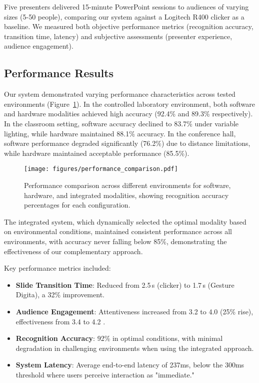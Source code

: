 \documentclass[arxiv,usenatbib]{iupartex}
\begin{document}
Five presenters delivered 15-minute PowerPoint sessions to audiences of varying sizes (5-50 people), comparing our system against a Logitech R400 clicker as a baseline. We measured both objective performance metrics (recognition accuracy, transition time, latency) and subjective assessments (presenter experience, audience engagement).

\subsection{Performance Results}
Our system demonstrated varying performance characteristics across tested environments (Figure~\ref{fig3}). In the controlled laboratory environment, both software and hardware modalities achieved high accuracy (92.4\% and 89.3\% respectively). In the classroom setting, software accuracy declined to 83.7\% under variable lighting, while hardware maintained 88.1\% accuracy. In the conference hall, software performance degraded significantly (76.2\%) due to distance limitations, while hardware maintained acceptable performance (85.5\%).

\begin{figure}
    \begin{center}
        \label{fig3}
        \texttt{[image: figures/performance\_comparison.pdf]}
        \caption{Performance comparison across different environments for software, hardware, and integrated modalities, showing recognition accuracy percentages for each configuration.} 
    \end{center}
\end{figure}

The integrated system, which dynamically selected the optimal modality based on environmental conditions, maintained consistent performance across all environments, with accuracy never falling below 85\%, demonstrating the effectiveness of our complementary approach.

Key performance metrics included:

\begin{itemize}
  \item \textbf{Slide Transition Time}: Reduced from 2.5\,s (clicker) to 1.7\,s (Gesture Digita), a 32\% improvement.
  \item \textbf{Audience Engagement}: Attentiveness increased from 3.2 to 4.0 (25\% rise), effectiveness from 3.4 to 4.2 \cite{Smith2020}.
  \item \textbf{Recognition Accuracy}: 92\% in optimal conditions, with minimal degradation in challenging environments when using the integrated approach.
  \item \textbf{System Latency}: Average end-to-end latency of 237ms, below the 300ms threshold where users perceive interaction as "immediate."
\end{itemize}
\end{document}
